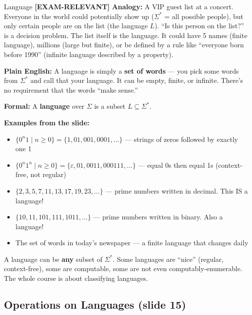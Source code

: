 \documentclass[11pt,a4paper]{article}
\newcommand{\kemark}{\textcolor{red!70!black}{\textbf{[EXAM-RELEVANT]}}}
\newcommand{\kt}[1]{\par\vspace{0.3em}\colorbox{yellow!60}{\parbox{\dimexpr\linewidth-2\fboxsep}{#1}}\vspace{0.3em}}
\begin{document}
\begin{definitionbox}{Language \kemark}
\textbf{Analogy:} A VIP guest list at a concert. Everyone in the world could potentially show up ($\Sigma^*$ = all possible people), but only certain people are on the list (the language $L$). ``Is this person on the list?'' is a decision problem. The list itself is the language. It could have 5 names (finite language), millions (large but finite), or be defined by a rule like ``everyone born before 1990'' (infinite language described by a property).

\textbf{Plain English:} A language is simply a \textbf{set of words} --- you pick some words from $\Sigma^*$ and call that your language. It can be empty, finite, or infinite. There's no requirement that the words ``make sense.''

\textbf{Formal:} A \textbf{language} over $\Sigma$ is a subset $L \subseteq \Sigma^*$.

\textbf{Examples from the slide:}
\begin{itemize}[nosep]
\item $\{0^n 1 \mid n \geq 0\} = \{1, 01, 001, 0001, \ldots\}$ --- strings of zeros followed by exactly one 1
\item $\{0^n 1^n \mid n \geq 0\} = \{\varepsilon, 01, 0011, 000111, \ldots\}$ --- equal 0s then equal 1s (context-free, not regular)
\item $\{2, 3, 5, 7, 11, 13, 17, 19, 23, \ldots\}$ --- prime numbers written in decimal. This IS a language!
\item $\{10, 11, 101, 111, 1011, \ldots\}$ --- prime numbers written in binary. Also a language!
\item The set of words in today's newspaper --- a finite language that changes daily
\end{itemize}

\kt{A language can be \textbf{any} subset of $\Sigma^*$. Some languages are ``nice'' (regular, context-free), some are computable, some are not even computably-enumerable. The whole course is about classifying languages.}
\end{definitionbox}

\subsection{Operations on Languages (slide 15)}
\end{document}

